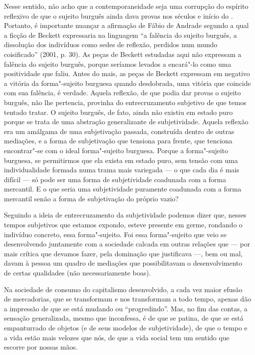 Nesse sentido, não acho que a contemporaneidade seja uma
corrupção do espírito reflexivo de que o sujeito burguês ainda dava provas
nos séculos  e início do . Portanto, é importante nuançar
a afirmação de Fábio de Andrade segundo a qual a ficção de Beckett
expressaria na linguagem ``a falência do sujeito burguês, a dissolução
dos indivíduos como sedes de reflexão, perdidos num mundo coisificado''
(2001, p. 30). As peças de Beckett estudadas aqui não
expressam a falência do sujeito burguês, porque seríamos levados a
encará"-lo como uma positividade que faliu. Antes do
mais, as peças de Beckett expressam em negativo a vitória da
forma"-sujeito burguesa quando desdobrada, uma vitória que coincide com
sua falência, é verdade. Aquela reflexão, de que podia dar provas o
sujeito burguês, não lhe pertencia, provinha do entrecruzamento
subjetivo de que temos tentado tratar. O sujeito burguês, de fato, ainda
não existiu em estado puro porque se trata de uma abstração
generalizante de subjetividade. Aquela reflexão era um amálgama de uma
subjetivação passada, construída dentro de outras mediações, e a forma
de subjetivação que tensiona para frente, que tenciona encontrar"-se com
o ideal forma"-sujeito burguesa. Porque a forma"-sujeito burguesa, se
permitirmos que ela exista em estado puro, sem tensão com uma
individualidade formada numa trama mais variegada --- o que cada dia é
mais difícil --- só pode ser uma forma de subjetividade coadunada com a
forma mercantil. E o que seria uma subjetividade puramente coadunada com
a forma mercantil senão a forma de subjetivação do próprio vazio?

Seguindo a ideia de entrecruzamento da subjetividade podemos dizer que, nesses tempos subjetivos que estamos expondo, esteve presente em germe, rondando o indivíduo concreto, essa
forma"-sujeito. Foi essa forma"-sujeito que veio se desenvolvendo
juntamente com a sociedade calcada em outras relações que --- por mais
crítica que devamos fazer, pela dominação que justificava ---, bem ou
mal, davam à pessoa um quadro de mediações que possibilitavam o
desenvolvimento de certas qualidades (não necessariamente boas).

Na sociedade de consumo do capitalismo desenvolvido, a cada vez maior
efusão de mercadorias, que se transformam e nos transformam a todo
tempo, apenas dão a impressão de que se está mudando ou ``progredindo''.
Mas, no fim das contas, a sensação generalizada, mesmo que inconfessa, é
de que se patina, de que se está empanturrado de objetos (e de seus
modelos de subjetividade), de que o tempo e a vida estão mais velozes
que nós, de que a vida social tem um sentido que escorre por nossas
mãos.

